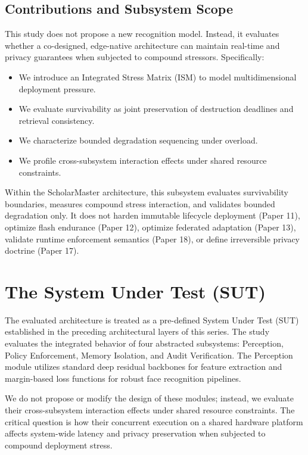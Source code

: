 \documentclass[conference]{IEEEtran}
\begin{document}
\subsection{Contributions and Subsystem Scope}
This study does not propose a new recognition model. Instead, it evaluates whether a co-designed, edge-native architecture can maintain real-time and privacy guarantees when subjected to compound stressors. Specifically:
\begin{itemize}
    \item We introduce an Integrated Stress Matrix (ISM) to model multidimensional deployment pressure.
    \item We evaluate survivability as joint preservation of destruction deadlines and retrieval consistency.
    \item We characterize bounded degradation sequencing under overload.
    \item We profile cross-subsystem interaction effects under shared resource constraints.
\end{itemize}

Within the ScholarMaster architecture, this subsystem evaluates survivability boundaries, measures compound stress interaction, and validates bounded degradation only. It does not harden immutable lifecycle deployment (Paper 11), optimize flash endurance (Paper 12), optimize federated adaptation (Paper 13), validate runtime enforcement semantics (Paper 18), or define irreversible privacy doctrine (Paper 17).

\section{The System Under Test (SUT)}

The evaluated architecture is treated as a pre-defined System Under Test (SUT) established in the preceding architectural layers of this series. The study evaluates the integrated behavior of four abstracted subsystems: Perception, Policy Enforcement, Memory Isolation, and Audit Verification. The Perception module utilizes standard deep residual backbones \cite{b2} for feature extraction and margin-based loss functions \cite{b1} for robust face recognition pipelines.

We do not propose or modify the design of these modules; instead, we evaluate their cross-subsystem interaction effects under shared resource constraints. The critical question is how their concurrent execution on a shared hardware platform affects system-wide latency and privacy preservation when subjected to compound deployment stress.
\end{document}
